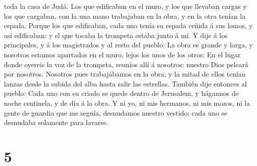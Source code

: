 toda la casa de Judá.  Los que edificaban en el muro, y
los que llevaban cargas y los que cargaban, con la una mano trabajaban
en la obra, y en la otra tenían la espada.  Porque los
que edificaban, cada uno tenía su espada ceñida á sus lomos, y así
edificaban: y el que tocaba la trompeta estaba junto á mí.
 Y dije á los principales, y á los magistrados y al resto
del pueblo: La obra es grande y larga, y nosotros estamos apartados en
el muro, lejos los unos de los otros:  En el lugar donde
oyereis la voz de la trompeta, reuníos allí á nosotros: nuestro Dios
peleará por nosotros.  Nosotros pues trabajábamos en la
obra; y la mitad de ellos tenían lanzas desde la subida del alba hasta
salir las estrellas.  También dije entonces al pueblo:
Cada uno con su criado se quede dentro de Jerusalem, y hágannos de noche
centinela, y de día á la obra.  Y ni yo, ni mis hermanos,
ni mis mozos, ni la gente de guardia que me seguía, desnudamos nuestro
vestido: cada uno se desnudaba solamente para lavarse.

\hypertarget{section-4}{%
\section{5}\label{section-4}}

